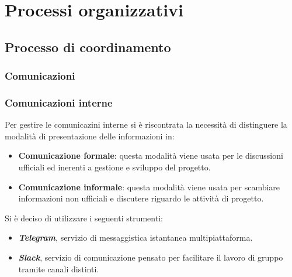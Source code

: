 \section{Processi organizzativi}
\subsection{Processo di coordinamento}

\subsubsection{Comunicazioni}
\subsubsection{Comunicazioni interne}
	Per gestire le comunicazini interne si è riscontrata la necessità di distinguere la modalità di presentazione delle informazioni in:
	\begin{itemize}
	\item\textbf{Comunicazione formale}: questa modalità viene usata per le discussioni ufficiali ed inerenti a gestione e sviluppo del progetto. 
	\item\textbf{Comunicazione informale}: questa modalità viene usata per scambiare informazioni non ufficiali e discutere riguardo le attività di progetto.
	\end{itemize}
	
	Si è deciso di utilizzare i seguenti strumenti:
	\begin{itemize}
	\item\textbf{\textit{Telegram}}, servizio di messaggistica istantanea multipiattaforma.
	\item\textbf{\textit{Slack}}, servizio di comunicazione pensato per facilitare il lavoro di gruppo tramite canali distinti.   	
	\end{itemize}
	
